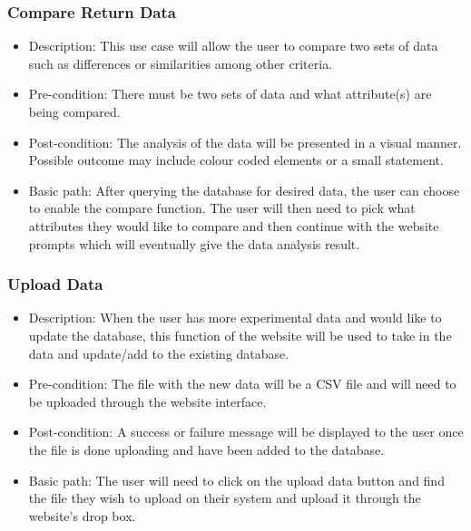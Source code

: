 \documentclass[12pt]{article}
\begin{document}
\subsubsection{Compare Return Data}
\begin{itemize}
  \item Description: This use case will allow the user to compare two sets of
  data such as differences or similarities among other criteria.
  \item Pre-condition: There must be two sets of data and what attribute(s) are
  being compared. 
  \item Post-condition: The analysis of the data will be presented in a visual
  manner. Possible outcome may include colour coded elements or a small statement. 
  \item Basic path: After querying the database for desired data, the user can
  choose to enable the compare function. The user will then need to pick what
  attributes they would like to compare and then continue with the website
  prompts which will eventually give the data analysis result.
\end{itemize}

\subsubsection{Upload Data}
\begin{itemize}
  \item Description: When the user has more experimental data and would like to
  update the database, this function of the website will be used to take in the
  data and update/add to the existing database.
  \item Pre-condition: The file with the new data will be a CSV file and will
  need to be uploaded through the website interface.
  \item Post-condition: A success or failure message will be displayed to the
  user once the file is done uploading and have been added to the database.
  \item Basic path: The user will need to click on the upload data button and
  find the file they wish to upload on their system and upload it through the
  website's drop box. 
\end{itemize}
\end{document}
